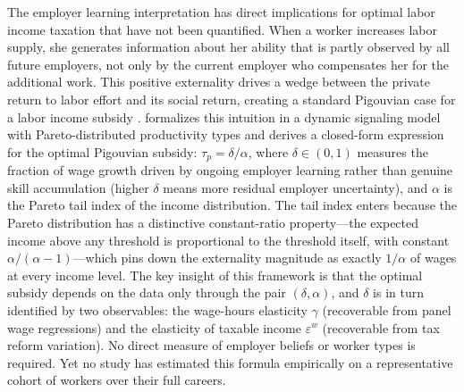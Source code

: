 \documentclass[12pt]{article}
\theoremstyle{definition}
\theoremstyle{remark}
\begin{document}
The employer learning interpretation has direct implications for optimal labor income taxation
that have not been quantified. When a worker increases labor supply, she generates information
about her ability that is partly observed by all future employers, not only by the current
employer who compensates her for the additional work. This positive externality drives a wedge
between the private return to labor effort and its social return, creating a standard
Pigouvian case for a labor income subsidy \citep{boskin1975taxation, stiglitz1982self}.
\citet{sztutman2024} formalizes this intuition in a dynamic signaling model with Pareto-distributed
productivity types and derives a closed-form expression for the optimal Pigouvian subsidy:
$\tau_p = \delta / \alpha$, where $\delta \in (0,1)$ measures the fraction of wage growth
driven by ongoing employer learning rather than genuine skill accumulation (higher $\delta$
means more residual employer uncertainty), and $\alpha$ is the Pareto tail index of the income
distribution. The tail index enters because the Pareto distribution has a distinctive
constant-ratio property---the expected income above any threshold is proportional to the
threshold itself, with constant $\alpha/(\alpha-1)$---which pins down the externality magnitude
as exactly $1/\alpha$ of wages at every income level. The key insight of this framework is
that the optimal subsidy depends on the data only through the pair $(\delta, \alpha)$, and
$\delta$ is in turn identified by two observables: the wage-hours elasticity $\gamma$
(recoverable from panel wage regressions) and the elasticity of taxable income $\varepsilon^w$
(recoverable from tax reform variation). No direct measure of employer beliefs or worker types
is required. Yet no study has estimated this formula empirically on a representative cohort of
workers over their full careers.
\end{document}
